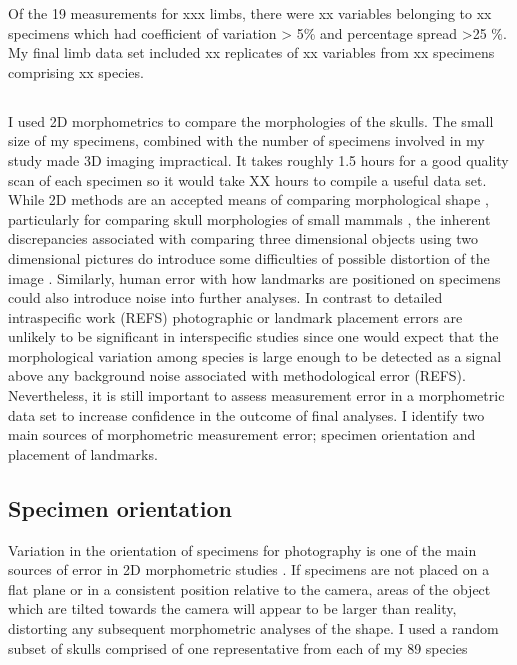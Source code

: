 Of the 19 measurements for xxx limbs, there were xx variables belonging to xx specimens which had coefficient of variation > 5\% and percentage spread >25 \%. My final limb data set included xx replicates of xx variables from xx specimens comprising xx species.

\subsection{}

I used 2D morphometrics to compare the morphologies of the skulls. The small size of my specimens, combined with the number of specimens involved in my study made 3D imaging impractical. It takes roughly 1.5 hours for a good quality scan of each specimen so it would take XX hours to compile a useful data set. While 2D methods are an accepted means of comparing morphological shape \citep[e.g.][]{Adams2004, Mitteroecker2009}, particularly for comparing skull morphologies of small mammals \citep[e.g.][]{Cardini2003, Panchetti2008, White2008, Barrow2008, Scalici2011}, the inherent discrepancies associated with comparing three dimensional objects using two dimensional pictures do introduce some difficulties of possible distortion of the image \citep{Arnqvist1998}. Similarly, human error with how landmarks are positioned on specimens could also introduce noise into further analyses. In contrast to detailed intraspecific work (REFS) photographic or landmark placement errors are unlikely to be significant in interspecific studies since one would expect that the morphological variation among species is large enough to  be detected as a signal above any background noise associated with methodological error (REFS). Nevertheless, it is still important to assess measurement error in a morphometric data set to increase confidence in the outcome of final analyses.
I identify two main sources of morphometric measurement error; specimen orientation and placement of landmarks.


\subsection{\normalfont Specimen orientation}

Variation in the orientation of specimens for photography is one of the main sources of error in 2D morphometric studies \citep{Adriaens2007}. If specimens are not placed on a flat plane or in a consistent position relative to the camera, areas of the object which are tilted towards the camera will appear to be larger than reality, distorting any subsequent morphometric analyses of the shape. 
I used a random subset of skulls comprised of one representative from each of my 89 species 

